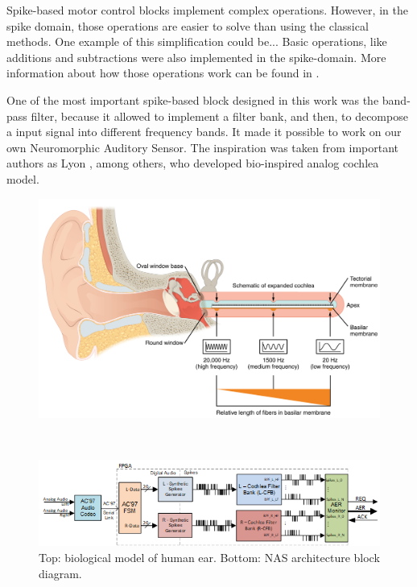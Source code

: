 Spike-based motor control blocks implement complex operations. However, in the spike domain, those operations are easier to solve than using the classical methods. One example of this simplification could be... Basic operations, like additions and subtractions were also implemented in the spike-domain. More information about how those operations work can be found in \cite{jimenez2010building}.


One of the most important spike-based block designed in this work was the band-pass filter, because it allowed to implement a filter bank, and then, to decompose a input signal into different frequency bands. It made it possible to work on our own Neuromorphic Auditory Sensor. The inspiration was taken from important authors as Lyon \cite{lyon1988analog}, among others, who developed bio-inspired analog cochlea model.

\begin{figure}[H]
  \centering
  \begin{minipage}[b]{0.8\textwidth}
    \centering
    \includegraphics[width=1\textwidth]{biological_ear_model.jpg}
    \label{fig:biological_model}
  \end{minipage}
  \\%
  \begin{minipage}[b]{1\textwidth}
    \centering
    \includegraphics[width=1\textwidth]{NAS_Block_Diagram.png}
    \caption{Top: biological model of human ear. Bottom: NAS architecture block diagram.}
    \label{fig:nas_block_diagram}
  \end{minipage}
\end{figure}


